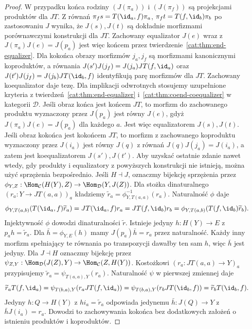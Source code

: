 \begin{proof}
W przypadku końca rodziny $(J(\pi_a))$ i $(J(\pi_f))$ są projekcjami produktów dla $JT$. Z równań $\pi_f s=T(\id_a,f)\pi_a$, $\pi_f t=T(f,\id_b)\pi_b$ po zastosowaniu $J$ wynika, że $J(s),J(t)$ są dokładnie morfizmami porównawczymi konstrukcji dla $JT$. Zachowany equalizator $J(e)$ wraz z $J(\pi_a)J(e)=J(p_a)$ jest więc końcem przez twierdzenie~\ref{cat:thm:end-equalizer}. Dla kokońca obrazy morfizmów $j_a,j_f$ są morfizmami kanonicznymi koproduktów, a równania $J(s')J(j_f)=J(j_a)JT(f,\id_a)$ oraz $J(t')J(j_f)=J(j_b)JT(\id_b,f)$ identyfikują parę morfizmów dla $JT$. Zachowany koequalizator daje tezę. Dla implikacji odwrotnych stosujemy uzupełnione kryteria z twierdzeń~\ref{cat:thm:end-equalizer} i~\ref{cat:thm:coend-coequalizer} w kategorii $\mathcal D$. Jeśli obraz końca jest końcem $JT$, to morfizm do zachowanego produktu wyznaczony przez $J(p_a)$ jest równy $J(e)$, gdyż $J(\pi_a)J(e)=J(p_a)$ dla każdego $a$. Jest więc equalizatorem $J(s),J(t)$. Jeśli obraz kokońca jest kokońcem $JT$, to morfizm z zachowanego koproduktu wyznaczony przez $J(i_a)$ jest równy $J(q)$ z równań $J(q)J(j_a)=J(i_a)$, a zatem jest koequalizatorem $J(s'),J(t')$. Aby uzyskać ostatnie zdanie nawet wtedy, gdy produkty i equalizatory z powyższych konstrukcji nie istnieją, można użyć sprzężenia bezpośrednio. Jeśli $H\dashv J$, oznaczmy bijekcję sprzężenia przez $\phi_{Y,Z}:\Hom_{\mathcal C}(H(Y),Z)\to\Hom_{\mathcal D}(Y,J(Z))$. Dla stożka dinaturalnego $(r_a:Y\to JT(a,a))_a$ kładziemy $\widetilde r_a=\phi_{Y,T(a,a)}^{-1}(r_a)$. Naturalność $\phi$ daje
\[
 \phi_{Y,T(a,b)}(T(\id_a,f)\widetilde r_a)
 =JT(\id_a,f)r_a
 =JT(f,\id_b)r_b
 =\phi_{Y,T(a,b)}(T(f,\id_b)\widetilde r_b).
\]
Injektywność $\phi$ dowodzi dinaturalności $\widetilde r$. Istnieje jedyny $h:H(Y)\to E$ z $p_a h=\widetilde r_a$. Dla $\bar h=\phi_{Y,E}(h)$ mamy $J(p_a)\bar h=r_a$ przez naturalność. Każdy inny morfizm spełniający te równania po transpozycji dawałby ten sam $h$, więc $\bar h$ jest jedyny.
Dla $J\dashv H$ oznaczmy bijekcję przez $\psi_{Z,Y}:\Hom_{\mathcal D}(J(Z),Y)\to\Hom_{\mathcal C}(Z,H(Y))$. Kostożkowi $(r_a:JT(a,a)\to Y)_a$ przypisujemy $\widetilde r_a=\psi_{T(a,a),Y}(r_a)$. Naturalność $\psi$ w pierwszej zmiennej daje
\[
 \widetilde r_a T(f,\id_a)
 =\psi_{T(b,a),Y}(r_a JT(f,\id_a))
 =\psi_{T(b,a),Y}(r_b JT(\id_b,f))
 =\widetilde r_b T(\id_b,f).
\]
Jedyny $h:Q\to H(Y)$ z $h i_a=\widetilde r_a$ odpowiada jedynemu $\bar h:J(Q)\to Y$ z $\bar h J(i_a)=r_a$. Dowodzi to zachowywania kokońca bez dodatkowych założeń o istnieniu produktów i koproduktów.
\end{proof}
